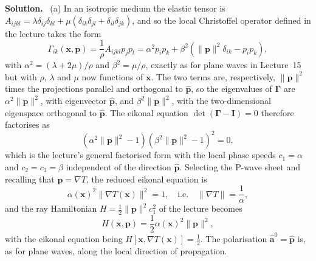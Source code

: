 \documentclass[a4paper,12pt]{paper}
\newenvironment{solution}{\par\noindent\textbf{Solution.}\ }{\par\medskip}
\begin{document}
\begin{solution}
(a) In an isotropic medium the elastic tensor is
$A_{ijkl}=\lambda\delta_{ij}\delta_{kl}+\mu(\delta_{ik}\delta_{jl}+\delta_{il}\delta_{jk})$, and so the
local Christoffel operator defined in the lecture takes the form
\begin{equation}
\Gamma_{ik}(\mathbf{x},\mathbf{p})=\frac{1}{\rho}A_{ijkl}p_{j}p_{l}
=\alpha^{2}p_{i}p_{k}+\beta^{2}\left(\|\mathbf{p}\|^{2}\delta_{ik}-p_{i}p_{k}\right),
\label{eq:1}
\end{equation}
with $\alpha^{2}=(\lambda+2\mu)/\rho$ and $\beta^{2}=\mu/\rho$, exactly as for plane waves in
Lecture~15 but with $\rho$, $\lambda$ and $\mu$ now functions of $\mathbf{x}$. The two terms are,
respectively, $\|\mathbf{p}\|^{2}$ times the projections parallel and orthogonal to
$\hat{\mathbf{p}}$, so the eigenvalues of $\bm{\Gamma}$ are $\alpha^{2}\|\mathbf{p}\|^{2}$, with
eigenvector $\hat{\mathbf{p}}$, and $\beta^{2}\|\mathbf{p}\|^{2}$, with the two-dimensional
eigenspace orthogonal to $\hat{\mathbf{p}}$. The eikonal equation
$\det(\bm{\Gamma}-\mathbf{I})=0$ therefore factorises as
\begin{equation}
\left(\alpha^{2}\|\mathbf{p}\|^{2}-1\right)\left(\beta^{2}\|\mathbf{p}\|^{2}-1\right)^{2}=0,
\label{eq:2}
\end{equation}
which is the lecture's general factorised form with the local phase speeds
$c_{1}=\alpha$ and $c_{2}=c_{3}=\beta$ independent of the direction $\hat{\mathbf{p}}$. Selecting
the P-wave sheet and recalling that $\mathbf{p}=\nabla T$, the reduced eikonal equation is
\begin{equation}
\alpha(\mathbf{x})^{2}\|\nabla T(\mathbf{x})\|^{2}=1,\quad\text{i.e.}\quad
\|\nabla T\|=\frac{1}{\alpha},
\label{eq:3}
\end{equation}
and the ray Hamiltonian $H=\frac{1}{2}\|\mathbf{p}\|^{2}c_{1}^{2}$ of the lecture becomes
\begin{equation}
H(\mathbf{x},\mathbf{p})=\frac{1}{2}\alpha(\mathbf{x})^{2}\|\mathbf{p}\|^{2},
\label{eq:4}
\end{equation}
with the eikonal equation being $H[\mathbf{x},\nabla T(\mathbf{x})]=\frac{1}{2}$. The polarisation
$\hat{\mathbf{a}}^{0}=\hat{\mathbf{p}}$ is, as for plane waves, along the local direction of
propagation.


\end{solution}
\end{document}
